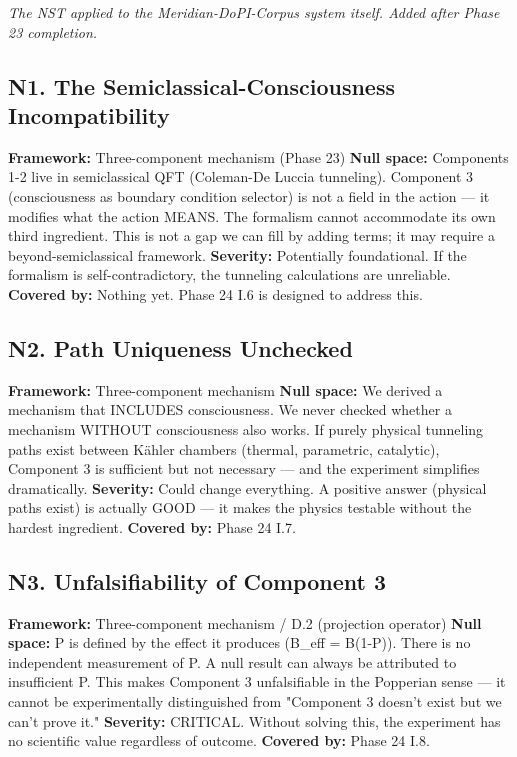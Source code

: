 \textit{The NST applied to the Meridian-DoPI-Corpus system itself. Added after Phase 23 completion.}


\subsection*{N1. The Semiclassical-Consciousness Incompatibility}


\textbf{Framework:} Three-component mechanism (Phase 23) \textbf{Null space:} Components 1-2 live in semiclassical QFT (Coleman-De Luccia tunneling). Component 3 (consciousness as boundary condition selector) is not a field in the action — it modifies what the action MEANS. The formalism cannot accommodate its own third ingredient. This is not a gap we can fill by adding terms; it may require a beyond-semiclassical framework. \textbf{Severity:} Potentially foundational. If the formalism is self-contradictory, the tunneling calculations are unreliable. \textbf{Covered by:} Nothing yet. Phase 24 I.6 is designed to address this.


\subsection*{N2. Path Uniqueness Unchecked}


\textbf{Framework:} Three-component mechanism \textbf{Null space:} We derived a mechanism that INCLUDES consciousness. We never checked whether a mechanism WITHOUT consciousness also works. If purely physical tunneling paths exist between Kähler chambers (thermal, parametric, catalytic), Component 3 is sufficient but not necessary — and the experiment simplifies dramatically. \textbf{Severity:} Could change everything. A positive answer (physical paths exist) is actually GOOD — it makes the physics testable without the hardest ingredient. \textbf{Covered by:} Phase 24 I.7.


\subsection*{N3. Unfalsifiability of Component 3}


\textbf{Framework:} Three-component mechanism / D.2 (projection operator) \textbf{Null space:} P is defined by the effect it produces (B\_eff = B(1-P)). There is no independent measurement of P. A null result can always be attributed to insufficient P. This makes Component 3 unfalsifiable in the Popperian sense — it cannot be experimentally distinguished from "Component 3 doesn't exist but we can't prove it." \textbf{Severity:} CRITICAL. Without solving this, the experiment has no scientific value regardless of outcome. \textbf{Covered by:} Phase 24 I.8.


